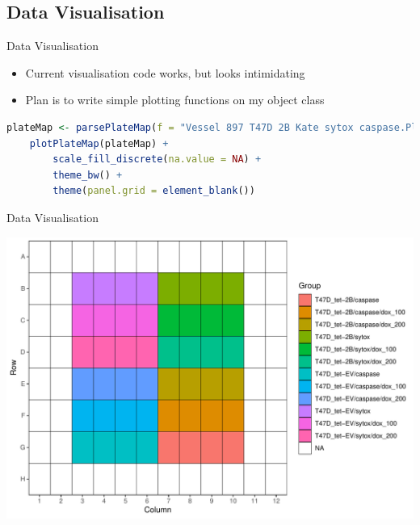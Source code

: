 \documentclass[11pt]{beamer}
\begin{document}
\subsection{Data Visualisation}

\begin{frame}[fragile]{Data Visualisation}

	\begin{itemize}
		\item Current visualisation code works, but looks intimidating
		\item Plan is to write simple plotting functions on my object class
	\end{itemize}

%

	\begin{lstlisting}[language=R]
	plateMap <- parsePlateMap(f = "Vessel 897 T47D 2B Kate sytox caspase.PlateMap")
	plotPlateMap(plateMap) +
    	scale_fill_discrete(na.value = NA) +
	    theme_bw() +
	    theme(panel.grid = element_blank())
	\end{lstlisting}
	

\end{frame}

\begin{frame}[fragile]{Data Visualisation}

	\center
	\includegraphics[width=0.8\linewidth]{figures/PlateMap.pdf} 


\end{frame}
\end{document}
